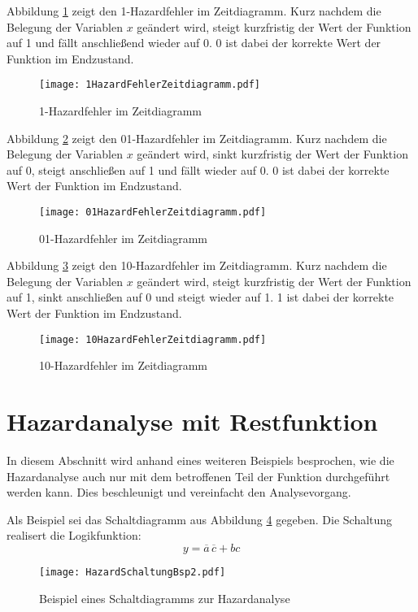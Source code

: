 Abbildung \ref{1HazZeitDiag} zeigt den 1-Hazardfehler im Zeitdiagramm. Kurz nachdem die Belegung der Variablen $x$ geändert wird, steigt kurzfristig der Wert der Funktion auf 1 und fällt anschließend wieder auf 0. 0 ist dabei der korrekte Wert der Funktion im Endzustand.
\begin{figure}[htp]
	\centering
	\texttt{[image: 1HazardFehlerZeitdiagramm.pdf]}
	\caption{1-Hazardfehler im Zeitdiagramm}
	\label{1HazZeitDiag}
\end{figure}

Abbildung \ref{01HazZeitDiag} zeigt den 01-Hazardfehler im Zeitdiagramm. Kurz nachdem die Belegung der Variablen $x$ geändert wird, sinkt kurzfristig der Wert der Funktion auf 0, steigt anschließen auf 1 und fällt wieder auf 0. 0 ist dabei der korrekte Wert der Funktion im Endzustand.
\begin{figure}[htp]
	\centering
	\texttt{[image: 01HazardFehlerZeitdiagramm.pdf]}
	\caption{01-Hazardfehler im Zeitdiagramm}
	\label{01HazZeitDiag}
\end{figure}

Abbildung \ref{10HazZeitDiag} zeigt den 10-Hazardfehler im Zeitdiagramm. Kurz nachdem die Belegung der Variablen $x$ geändert wird, steigt kurzfristig der Wert der Funktion auf 1, sinkt anschließen auf 0 und steigt wieder auf 1. 1 ist dabei der korrekte Wert der Funktion im Endzustand.
\begin{figure}[htp]
	\centering
	\texttt{[image: 10HazardFehlerZeitdiagramm.pdf]}
	\caption{10-Hazardfehler im Zeitdiagramm}
	\label{10HazZeitDiag}
\end{figure}

\section{Hazardanalyse mit Restfunktion}
In diesem Abschnitt wird anhand eines weiteren Beispiels besprochen, wie die Hazardanalyse auch nur mit dem betroffenen Teil der Funktion durchgeführt werden kann. Dies beschleunigt und vereinfacht den Analysevorgang.

Als Beispiel sei das Schaltdiagramm aus Abbildung \ref{HazSchaltBsp2} gegeben. Die Schaltung realisert die Logikfunktion: 
$$y = \overline{a}\hspace{2pt}\overline{c}  + bc$$
\begin{figure}[htp]
	\centering
	\texttt{[image: HazardSchaltungBsp2.pdf]}
	\caption{Beispiel eines Schaltdiagramms zur Hazardanalyse}
	\label{HazSchaltBsp2}
\end{figure} 

